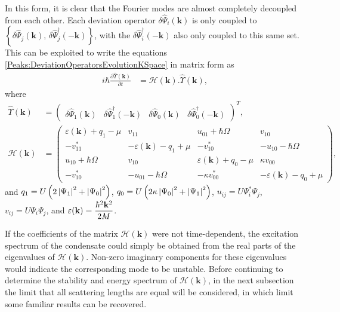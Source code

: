 In this form, it is clear that the Fourier modes are almost completely decoupled from each other. Each deviation operator $\delta\hat{\Psi}_i(\mathbf{k})$ is only coupled to $\left\{\delta\hat{\Psi}_j(\mathbf{k}),\, \delta\hat{\Psi}_j^\dagger(-\mathbf{k})\right\}$, with the $\delta\hat{\Psi}_i^\dagger(-\mathbf{k})$ also only coupled to this same set. This can be exploited to write the equations \eqref{Peaks:DeviationOperatorsEvolutionKSpace} in matrix form as
\begin{align}
    i \hbar \frac{\partial \hat{\Upsilon}(\mathbf{k})}{\partial t} &= \mathcal{H}(\mathbf{k}) . \hat{\Upsilon}(\mathbf{k}),
\end{align}
where
\begin{align}
    \hat{\Upsilon}(\mathbf{k}) &= 
    \begin{pmatrix}
        \delta\hat{\Psi}_1(\mathbf{k}) &
        \delta\hat{\Psi}_1^\dagger(-\mathbf{k}) &
        \delta\hat{\Psi}_0(\mathbf{k}) &
        \delta\hat{\Psi}_0^\dagger(-\mathbf{k})
    \end{pmatrix}^T,\\
    \mathcal{H}(\mathbf{k}) &=
    \begin{pmatrix}
        \varepsilon(\mathbf{k}) + q_{1} - \mu & v_{11} & u_{01} + \hbar \Omega & v_{10}\\
        -v_{11}^* & -\varepsilon(\mathbf{k}) - q_1 + \mu & -v_{10}^* & -u_{10} - \hbar \Omega\\
        u_{10} + \hbar \Omega & v_{10} & \varepsilon(\mathbf{k}) + q_0 - \mu & \kappa v_{00}\\
        -v_{10}^* & -u_{01} - \hbar \Omega & -\kappa v_{00}^* & -\varepsilon(\mathbf{k}) - q_0 + \mu
    \end{pmatrix},
\end{align}
and $q_1 = U\left(2\left|\Psi_1\right|^2+\left|\Psi_0\right|^2\right)$, $q_0 = U\left(2\kappa \left|\Psi_0\right|^2 + \left|\Psi_1\right|^2\right)$, $u_{ij} = U\Psi_i^*\Psi_j$, $v_{ij} = U\Psi_i\Psi_j$, and $\displaystyle \protect{\varepsilon(\mathbf{k}) = \frac{\hbar^2 \mathbf{k}^2}{2M}}$.

If the coefficients of the matrix $\mathcal{H}(\mathbf{k})$ were not time-dependent, the excitation spectrum of the condensate could simply be obtained from the real parts of the eigenvalues of $\mathcal{H}(\mathbf{k})$. Non-zero imaginary components for these eigenvalues would indicate the corresponding mode to be unstable. Before continuing to determine the stability and energy spectrum of $\mathcal{H}(\mathbf{k})$, in the next subsection the limit that all scattering lengths are equal will be considered, in which limit some familiar results can be recovered.

